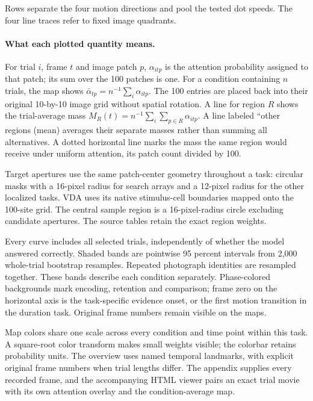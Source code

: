 \documentclass[11pt]{article}
\begin{document}
Rows separate the four motion directions and pool the tested dot speeds. The four line traces refer to fixed image quadrants.

\paragraph{What each plotted quantity means.}
For trial $i$, frame $t$ and image patch $p$, $\alpha_{itp}$ is the attention probability assigned to that patch; its sum over the 100 patches is one. For a condition containing $n$ trials, the map shows $\bar\alpha_{tp}=n^{-1}\sum_i\alpha_{itp}$. The 100 entries are placed back into their original 10-by-10 image grid without spatial rotation. A line for region $R$ shows the trial-average mass $M_R(t)=n^{-1}\sum_i\sum_{p\in R}\alpha_{itp}$. A line labeled ``other regions (mean) averages their separate masses rather than summing all alternatives. A dotted horizontal line marks the mass the same region would receive under uniform attention, its patch count divided by 100.

Target apertures use the same patch-center geometry throughout a task: circular masks with a 16-pixel radius for search arrays and a 12-pixel radius for the other localized tasks. VDA uses its native stimulus-cell boundaries mapped onto the 100-site grid. The central sample region is a 16-pixel-radius circle excluding candidate apertures. The source tables retain the exact region weights.

Every curve includes all selected trials, independently of whether the model answered correctly. Shaded bands are pointwise 95 percent intervals from 2,000 whole-trial bootstrap resamples. Repeated photograph identities are resampled together. These bands describe each condition separately. Phase-colored backgrounds mark encoding, retention and comparison; frame zero on the horizontal axis is the task-specific evidence onset, or the first motion transition in the duration task. Original frame numbers remain visible on the maps.

Map colors share one scale across every condition and time point within this task. A square-root color transform makes small weights visible; the colorbar retains probability units. The overview uses named temporal landmarks, with explicit original frame numbers when trial lengths differ. The appendix supplies every recorded frame, and the accompanying HTML viewer pairs an exact trial movie with its own attention overlay and the condition-average map.
\end{document}
